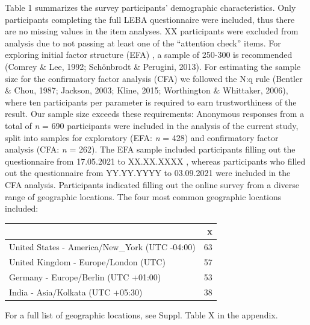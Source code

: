 \documentclass[
  english,
  man]{apa6}
\begin{document}
Table 1 summarizes the survey participants' demographic characteristics. Only participants completing the full LEBA questionnaire were included, thus there are no missing values in the item analyses. XX participants were excluded from analysis due to not passing at least one of the ``attention check'' items. For exploring initial factor structure (EFA) , a sample of 250-300 is recommended (Comrey \& Lee, 1992; Schönbrodt \& Perugini, 2013). For estimating the sample size for the confirmatory factor analysis (CFA) we followed the N:q rule (Bentler \& Chou, 1987; Jackson, 2003; Kline, 2015; Worthington \& Whittaker, 2006), where ten participants per parameter is required to earn trustworthiness of the result. Our sample size exceeds these requirements: Anonymous responses from a total of \emph{n} = 690 participants were included in the analysis of the current study, split into samples for exploratory (EFA: \emph{n} = 428) and confirmatory factor analysis (CFA: \emph{n} = 262). The EFA sample included participants filling out the questionnaire from 17.05.2021 to XX.XX.XXXX , whereas participants who filled out the questionnaire from YY.YY.YYYY to 03.09.2021 were included in the CFA analysis. Participants indicated filling out the online survey from a diverse range of geographic locations. The four most common geographic locations included:

\begin{tabular}{l|r}
\hline
  & x\\
\hline
United States - America/New\_York (UTC -04:00) & 63\\
\hline
United Kingdom - Europe/London (UTC) & 57\\
\hline
Germany - Europe/Berlin (UTC +01:00) & 53\\
\hline
India - Asia/Kolkata (UTC +05:30) & 38\\
\hline
\end{tabular}

For a full list of geographic locations, see Suppl. Table X in the appendix.
\end{document}
